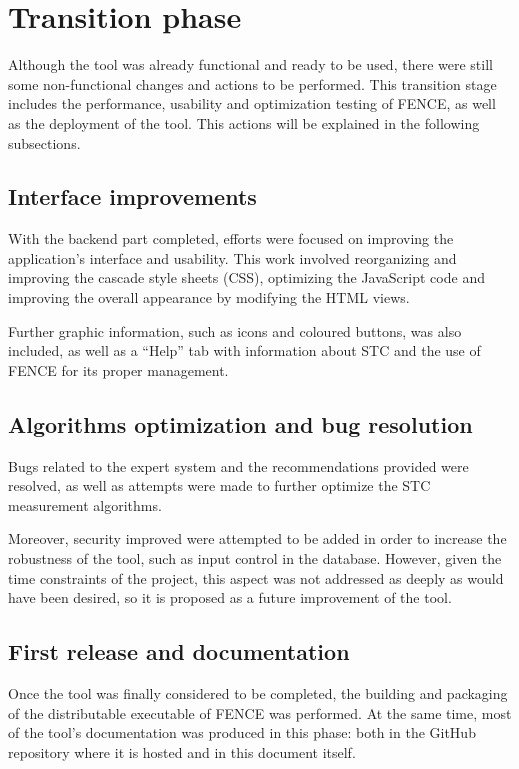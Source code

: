 \section{Transition phase}

Although the tool was already functional and ready to be used, there were still some non-functional changes and actions to be performed. This transition stage includes the performance, usability and optimization testing of FENCE, as well as the deployment of the tool. This actions will be explained in the following subsections.

\subsection{Interface improvements}

With the backend part completed, efforts were focused on improving the application's interface and usability. This work involved reorganizing and improving the cascade style sheets (CSS), optimizing the JavaScript code and improving the overall appearance by modifying the HTML views.

Further graphic information, such as icons and coloured buttons, was also included, as well as a “Help” tab with information about STC and the use of FENCE for its proper management.

\subsection{Algorithms optimization and bug resolution}

Bugs related to the expert system and the recommendations provided were resolved, as well as attempts were made to further optimize the STC measurement algorithms.

Moreover, security improved were attempted to be added in order to increase the robustness of the tool, such as input control in the database. However, given the time constraints of the project, this aspect was not addressed as deeply as would have been desired, so it is proposed as a future improvement of the tool.

\subsection{First release and documentation}

Once the tool was finally considered to be completed, the building and packaging of the distributable executable of FENCE was performed. At the same time, most of the tool's documentation was produced in this phase: both in the GitHub repository where it is hosted and in this document itself.

